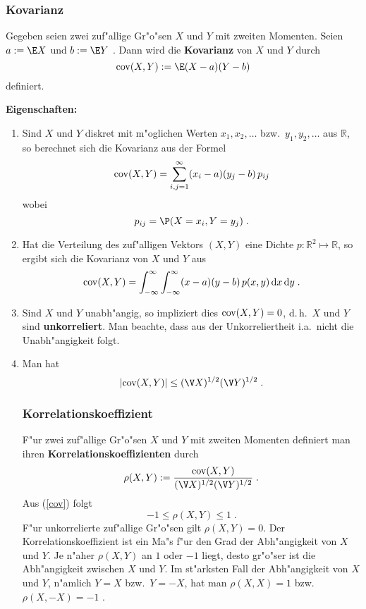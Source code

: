\documentclass[ngerman,draft,parskip=half,twoside]{scrartcl}
\newcommand*{\R}{\mathbb{R}}      %
\begin{document}
\subsubsection{Kovarianz}
Gegeben seien zwei zuf"allige Gr"o"sen $X$ und $Y$ mit zweiten Momenten.
Seien $a:=\E X$ und $b:=\E Y$ . Dann wird die \textbf{Kovarianz} von $X$ und $Y$ durch
$$
{\rm  cov}(X,Y):= \E(X-a)(Y-b)
$$
definiert.

\textbf{Eigenschaften:}

\begin{enumerate}
\item
Sind $X$ und $Y$ diskret mit m"oglichen Werten $x_1,x_2,\ldots$ bzw.~$y_1,y_2,\ldots$ aus $\R$,
so berechnet sich die Kovarianz aus der Formel
$$
{\rm  cov}(X,Y)=\sum_{i,j=1}^\infty (x_i-a)(y_j-b)\, p_{ij}
$$
wobei
$$
p_{ij}=\P(X=x_i, Y=y_j)\;.
$$
\item
Hat die Verteilung des zuf"alligen Vektors $(X,Y)$ eine Dichte $p \colon\R^2\mapsto\R$, so
ergibt sich die Kovarianz von $X$ und $Y$ aus
$$
{\rm  cov}(X,Y)=\int_{-\infty}^\infty \int_{-\infty}^\infty (x-a)(y-b)\,p(x,y)\,\mathrm d x\, \mathrm d y\;.
$$
\item
Sind $X$ und $Y$ unabh"angig, so impliziert dies ${\rm  cov}(X,Y)=0$, d.\,h.~$X$ und $Y$ sind
\textbf{unkorreliert}. Man beachte, dass aus der Unkorreliertheit i.a.~nicht die Unabh"angigkeit folgt.
\item
Man hat
\begin{equation}
\label{cov}
|{\rm  cov}(X,Y)|\le (\V X)^{1/2}(\V Y)^{1/2}\;.
\end{equation}
\subsubsection{Korrelationskoeffizient}
F"ur zwei zuf"allige Gr"o"sen $X$ und $Y$ mit zweiten Momenten definiert man ihren
\textbf{Korrelationskoeffizienten} durch
$$
\rho(X,Y):=\frac{{\rm  cov}(X,Y)}{(\V X)^{1/2}(\V Y)^{1/2}}\;.
$$
Aus (\ref{cov}) folgt
$$
-1\le \rho(X,Y)\le 1\;.
$$
F"ur unkorrelierte zuf"allige Gr"o"sen gilt $\rho(X,Y)=0$.
 Der Korrelationskoeffizient ist ein Ma"s f"ur den Grad der Abh"angigkeit von
$X$ und $Y$. Je n"aher $\rho(X,Y)$ an $1$ oder $-1$ liegt, desto gr"o"ser ist die
Abh"angigkeit zwischen $X$ und $Y$. Im st"arksten Fall
der Abh"angigkeit von $X$ und $Y$, n"amlich $Y=X$ bzw.~$Y=-X$, hat man $\rho(X,X)=1$ bzw.~$\rho(X,-X)=-1$ .
\end{enumerate}
\end{document}
